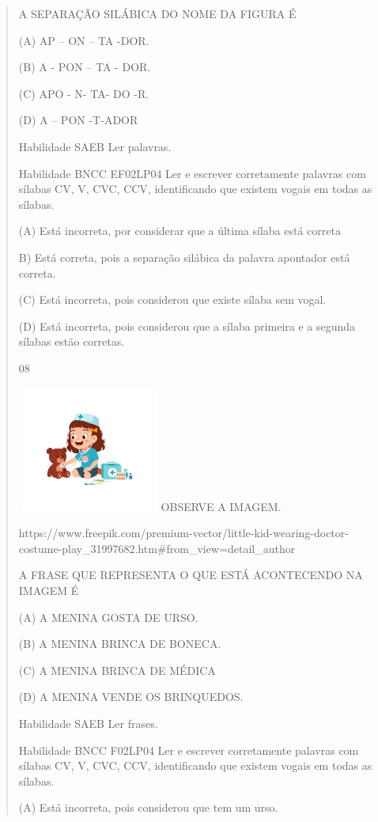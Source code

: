 {{{{\begin{verse}
{{\begin{escolha}
{{{{{A SEPARAÇÃO SILÁBICA DO NOME DA FIGURA É

(A) AP -- ON -- TA -DOR.

(B) A - PON -- TA - DOR.

(C) APO - N- TA- DO -R.

(D) A -- PON -T-ADOR

Habilidade SAEB Ler palavras.

Habilidade BNCC EF02LP04 Ler e escrever corretamente palavras com
sílabas CV, V, CVC, CCV, identificando que existem vogais em todas as
sílabas.

(A) \protect\hypertarget{_Hlk129375975}{}{}Está incorreta, por
considerar que a última sílaba está correta

B) Está correta, pois a separação silábica da palavra apontador está
correta.

(C) Está incorreta, pois considerou que existe sílaba sem vogal.

(D) Está incorreta, pois considerou que a sílaba primeira e a segunda
sílabas estão corretas.

\num{08}

\includegraphics[width=1.87273in,height=1.62645in]{media/image169.jpeg}OBSERVE
A IMAGEM.

https://www.freepik.com/premium-vector/little-kid-wearing-doctor-costume-play\_31997682.htm\#from\_view=detail\_author

A FRASE QUE REPRESENTA O QUE ESTÁ ACONTECENDO NA IMAGEM É

(A) A MENINA GOSTA DE URSO.

(B) A MENINA BRINCA DE BONECA.

(C) A MENINA BRINCA DE MÉDICA

(D) A MENINA VENDE OS BRINQUEDOS.

Habilidade SAEB Ler frases.

Habilidade BNCC F02LP04 Ler e escrever corretamente palavras com sílabas
CV, V, CVC, CCV, identificando que existem vogais em todas as sílabas.

(A) Está incorreta, pois considerou que tem um urso.

}}}}}
\end{escolha}}}
\end{verse}}}}}
